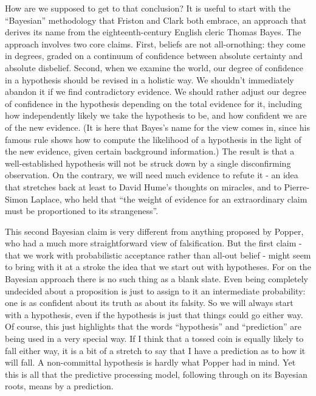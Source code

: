 How are we supposed to get to that conclusion? It is useful to start with the ``Bayesian'' methodology that Friston and Clark both embrace, an approach that derives its name from the eighteenth-century English cleric Thomas Bayes. The approach involves two core claims. First, beliefs are not all-ornothing: they come in degrees, graded on a continuum of confidence between absolute certainty and absolute disbelief. Second, when we examine the world, our degree of confidence in a hypothesis should be revised in a holistic way. We shouldn't immediately abandon it if we find contradictory evidence. We should rather adjust our degree of confidence in the hypothesis depending on the total evidence for it, including how independently likely we take the hypothesis to be, and how confident we are of the new evidence. (It is here that Bayes's name for the view comes in, since his famous rule shows how to compute the likelihood of a hypothesis in the light of the new evidence, given certain background information.) The result is that a well-established hypothesis will not be struck down by a single disconfirming observation. On the contrary, we will need much evidence to refute it - an idea that stretches back at least to David Hume's thoughts on miracles, and to Pierre-Simon Laplace, who held that ``the weight of evidence for an extraordinary claim must be proportioned to its strangeness''.

This second Bayesian claim is very different from anything proposed by Popper, who had a much more straightforward view of falsification. But the first claim - that we work with probabilistic acceptance rather than all-out belief - might seem to bring with it at a stroke the idea that we start out with hypotheses. For on the Bayesian approach there is no such thing as a blank slate. Even being completely undecided about a proposition is just to assign to it an intermediate probability: one is as confident about its truth as about its falsity. So we will always start with a hypothesis, even if the hypothesis is just that things could go either way. Of course, this just highlights that the words ``hypothesis'' and ``prediction'' are being used in a very special way. If I think that a tossed coin is equally likely to fall either way, it is a bit of a stretch to say that I have a prediction as to how it will fall. A non-committal hypothesis is hardly what Popper had in mind. Yet this is all that the predictive processing model, following through on its Bayesian roots, means by a prediction.

